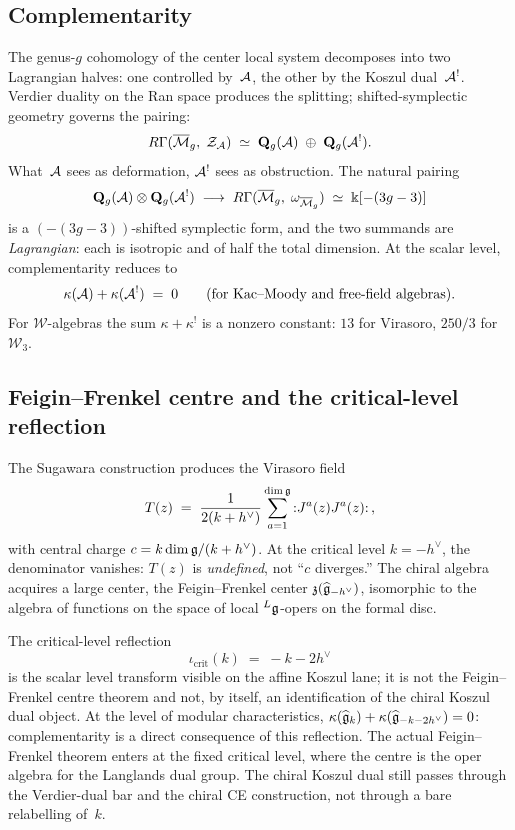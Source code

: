 \subsection*{Complementarity}

The genus-$g$ cohomology of the center local system decomposes into
two Lagrangian halves: one controlled by~$\mathcal{A}$, the other
by the Koszul dual~$\mathcal{A}^!$. Verdier duality on the Ran space
produces the splitting; shifted-symplectic geometry governs the
pairing:
\[
R\Gamma(\overline{\mathcal{M}}_g,\;\mathcal Z_{\mathcal{A}})
\;\simeq\;
\mathbf Q_g(\mathcal{A})\;\oplus\;\mathbf Q_g(\mathcal{A}^!).
\]
What~$\mathcal{A}$ sees as deformation, $\mathcal{A}^!$ sees as obstruction.
The natural pairing
\[
\mathbf Q_g(\mathcal{A})\otimes\mathbf Q_g(\mathcal{A}^!)
\;\longrightarrow\;
R\Gamma(\overline{\mathcal{M}}_g,\;\omega_{\overline{\mathcal{M}}_g})
\;\simeq\;\Bbbk[-(3g-3)]
\]
is a $(-(3g-3))$-shifted symplectic form, and the two summands are
\emph{Lagrangian}: each is isotropic and of half the total
dimension. At the scalar level, complementarity reduces to
\[
\kappa(\mathcal{A})+\kappa(\mathcal{A}^!)\;=\;0
\qquad\text{(for Kac--Moody and free-field algebras).}
\]
For $\mathcal{W}$-algebras the sum $\kappa+\kappa^!$ is a nonzero
constant: $13$ for Virasoro, $250/3$ for~$\mathcal{W}_3$.

\subsection*{Feigin--Frenkel centre and the critical-level reflection}

The Sugawara construction produces the Virasoro field
\[
T(z)
\;=\;
\frac{1}{2(k+h^\vee)}\sum_{a=1}^{\dim\mathfrak{g}}
{:}J^a(z)J^a(z){:}\,,
\]
with central charge $c=k\dim\mathfrak{g}/(k+h^\vee)$. At the
critical level $k=-h^\vee$, the denominator vanishes: $T(z)$ is
\emph{undefined}, not ``$c$ diverges.'' The chiral algebra
acquires a large center, the Feigin--Frenkel center
$\mathfrak z(\widehat{\mathfrak{g}}_{-h^\vee})$, isomorphic to the
algebra of functions on the space of local ${}^L\mathfrak{g}$-opers
on the formal disc.

The critical-level reflection
\[
\iota_{\mathrm{crit}}(k)\;=\;-k-2h^\vee
\]
is the scalar level transform visible on the affine Koszul lane; it
is not the Feigin--Frenkel centre theorem and not, by itself, an
identification of the chiral Koszul dual object. At the level of
modular characteristics,
$\kappa(\widehat{\mathfrak{g}}_k)+
\kappa(\widehat{\mathfrak{g}}_{-k-2h^\vee})=0$:
complementarity is a direct consequence of this reflection. The
actual Feigin--Frenkel theorem enters at the fixed critical level,
where the centre is the oper algebra for the Langlands dual group.
The chiral Koszul dual still passes through the Verdier-dual bar and
the chiral CE construction, not through a bare relabelling of~$k$.

